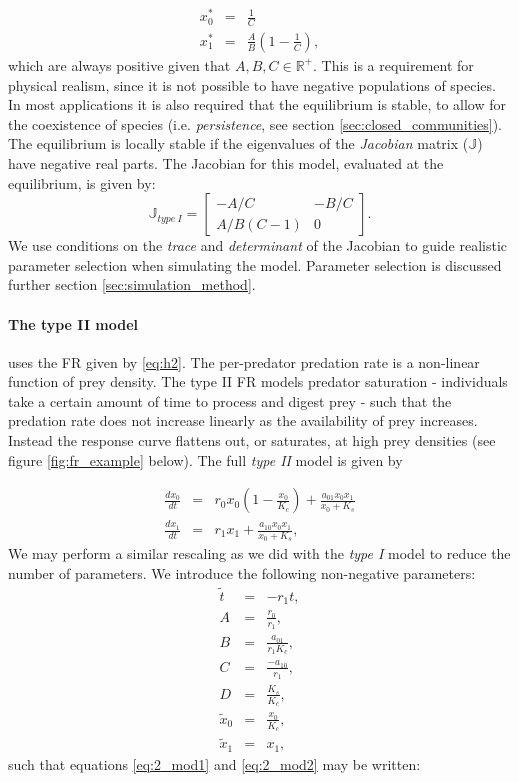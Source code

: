 \begin{eqnarray}
x_{0}^{*} &=& \frac{1}{C} \label{eq:lin_mod_sp1} \\[10pt]
x_{1}^{*} &=& \frac{A}{B}\left(1 - \frac{1}{C}\right) \label{eq:lin_mod_sp2}, 
\end{eqnarray}
%
which are always positive given that $A,B,C \in \mathbb{R}^+$. This is a requirement for physical realism, since it is not possible to have negative populations of species. In most applications it is also required that the equilibrium is stable, to allow for the coexistence of species (i.e. \emph{persistence}, see section \ref{sec:closed_communities}). The equilibrium is locally stable if the eigenvalues of the \emph{Jacobian} matrix ($\mathbb{J}$) have negative real parts. The Jacobian for this model, evaluated at the equilibrium, is given by:
\begin{equation}
\mathbb{J}_{type\ I} = 
\begin{bmatrix}
-A/C & -B/C \\ A/B(C-1) & 0
\end{bmatrix}  	.
\end{equation}
%
We use conditions on the \emph{trace} and \emph{determinant} of the Jacobian to guide realistic parameter selection when simulating the model. Parameter selection is discussed further section \ref{sec:simulation_method}. 


\paragraph*{The type II model} uses the FR given by \eqref{eq:h2}. The per-predator predation rate is a non-linear function of prey density. The type II FR models predator saturation - individuals take a certain amount of time to process and digest prey - such that the predation rate does not increase linearly as the availability of prey increases. Instead the response curve flattens out, or saturates, at high prey densities (see figure \ref{fig:fr_example} below). The full \emph{type II} model is given by

\begin{eqnarray}
\frac{dx_{0}}{dt} &=& r_0x_0\left(1-\frac{x_0}{K_c}\right) + \frac{a_{01}x_0x_1}{x_0 + K_s} \label{eq:2_mod1} \\[10pt]
\frac{dx_{1}}{dt} &=& r_1x_1 + \frac{a_{10}x_0x_1}{x_0 + K_s} \label{eq:2_mod2}, 
\end{eqnarray}
%
We may perform a similar rescaling as we did with the \emph{type I} model to reduce the number of parameters. We introduce the following non-negative parameters:
\begin{eqnarray}
\tilde{t} &=& -r_1 t, \\[10pt]
A &=& \frac{r_0}{r_1}, \\[10pt]
B &=& \frac{a_{01}}{r_1K_c}, \\[10pt]
C &=& \frac{-a_{10}}{r_1}, \\[10pt]
D &=& \frac{K_s}{K_c}, \\[10pt]
\tilde{x}_0 &=& \frac{x_0}{K_c}, \\[10pt]
\tilde{x}_1 &=& x_1,
\end{eqnarray}
%
such that equations \eqref{eq:2_mod1} and \eqref{eq:2_mod2} may be written:

